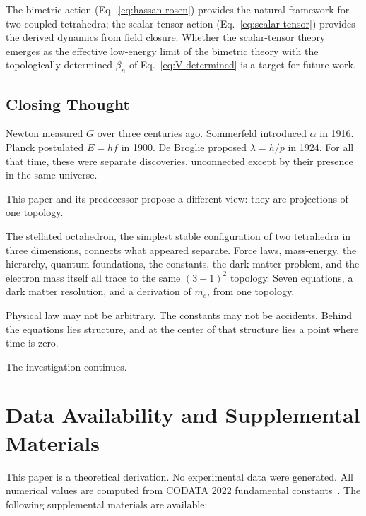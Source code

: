 \documentclass[aps,prd,preprint,superscriptaddress,showpacs,preprintnumbers,amsmath,amssymb,nofootinbib]{revtex4-2}
\begin{document}
The bimetric action (Eq.~\ref{eq:hassan-rosen}) provides the natural framework for two coupled tetrahedra; the scalar-tensor action (Eq.~\ref{eq:scalar-tensor}) provides the derived dynamics from field closure. Whether the scalar-tensor theory emerges as the effective low-energy limit of the bimetric theory with the topologically determined $\beta_n$ of Eq.~\ref{eq:V-determined} is a target for future work.

\subsection{Closing Thought}
\label{subsec:closing}

Newton measured $G$ over three centuries ago. Sommerfeld introduced $\alpha$ in 1916. Planck postulated $E = hf$ in 1900. De Broglie proposed $\lambda = h/p$ in 1924. For all that time, these were separate discoveries, unconnected except by their presence in the same universe.

This paper and its predecessor propose a different view: they are projections of one topology.

The stellated octahedron, the simplest stable configuration of two tetrahedra in three dimensions, connects what appeared separate. Force laws, mass-energy, the hierarchy, quantum foundations, the constants, the dark matter problem, and the electron mass itself all trace to the same $(3+1)^2$ topology. Seven equations, a dark matter resolution, and a derivation of $m_e$, from one topology.

Physical law may not be arbitrary. The constants may not be accidents. Behind the equations lies structure, and at the center of that structure lies a point where time is zero.

The investigation continues.

\section*{Data Availability and Supplemental Materials}

This paper is a theoretical derivation. No experimental data were generated. All numerical values are computed from CODATA 2022 fundamental constants~\cite{codata2022}. The following supplemental materials are available:
\end{document}
